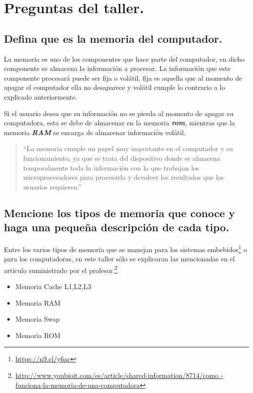 \documentclass[12pt,letterpaper]{article}
\begin{document}
\newpage


\section{Preguntas del taller.}\label{preguntas}
    \subsection{Defina que es la memoria del computador.}

La memoria es uno de los componentes que hace parte del computador, en dicho componente se almacena la información a procesar. La información que este componente procesará puede ser fija o volátil, fija es aquella que al momento de apagar el computador ella no desaparece y volátil cumple lo contrario a lo explicado anteriormente.

Si el usuario desea que su información no se pierda al momento de apagar su computadora, esta se debe de almacenar en la memoria \textbf{\emph{rom}}, mientras que la memoria \textbf{\textit{RAM}} se encarga de almacenar información volátil.

\begin{quote}
    ``La memoria cumple un papel muy importante en el computador y su funcionamiento, ya que se
    trata del dispositivo donde se almacena temporalmente toda la información con la que trabajan
    los microprocesadores para procesarla y devolver los resultados que los usuarios requieren.''\cite{GuiaProfesor}
\end{quote}

\subsection{Mencione los tipos de memoria que conoce y haga una pequeña descripción de cada tipo.}

Entre los varios tipos de memoria que se manejan para los sistemas embebidos\footnote{\url{https://n9.cl/y6ac}} o para los computadoras, en este taller sólo se explicaran las mencionadas en el artículo suministrado por el profesor.\footnote{\tiny{\url{http://www.youbioit.com/es/article/shared-information/8714/como
-funciona-la-memoria-de-una-computadora}}}

\begin{itemize}
    \item Memoria Cache L1,L2,L3
    \item Memoria RAM
    \item Memoria Swap
    \item Memoria ROM
\end{itemize}
\end{document}
